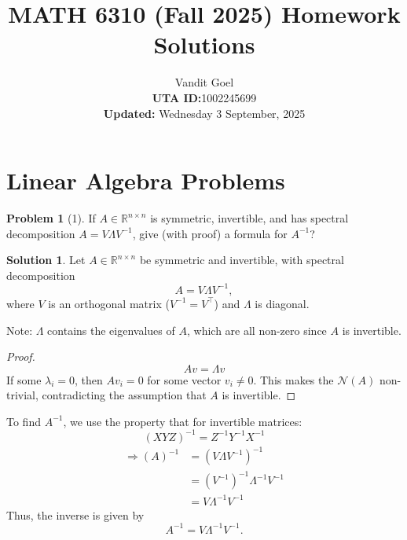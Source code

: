 \documentclass{amsart}[11pt]
\title{MATH 6310 (Fall 2025) Homework Solutions}
\author{Vandit Goel\\\textbf{UTA ID:}1002245699\\\textbf{Updated:} Wednesday  3 September, 2025}
\theoremstyle{definition}
\newtheorem*{problem}{Problem}
\newtheorem*{solution}{Solution}
\newcommand{\R}{\mathbb{R}}
\begin{document}
\maketitle

\section{Linear Algebra Problems}

\begin{problem}[1]
If $A\in\R^{n\times n}$ is symmetric, invertible, and has spectral decomposition $A=V\Lambda V^{-1}$, give (with proof) a formula for $A^{-1}$?

\begin{solution}
Let $A \in \mathbb{R}^{n \times n}$ be symmetric and invertible, with spectral decomposition
\[
A = V \Lambda V^{-1},
\]
where $V$ is an orthogonal matrix ($V^{-1} = V^\top$) and $\Lambda$ is diagonal.

Note: $\Lambda$ contains the eigenvalues of $A$, which are all non-zero since $A$ is invertible.
\begin{proof}
    \[Av=\Lambda v\]
    If some $\lambda_{i}=0$, then $Av_{i}=0$ for some vector $v_{i} \neq 0$. This makes the $\mathcal{N}(A)$ non-trivial, contradicting the assumption that $A$ is invertible.
\end{proof}

\vspace{\baselineskip}
\noindent To find $A^{-1}$, we use the property that for invertible matrices:
\[
(XYZ)^{-1} = Z^{-1} Y^{-1} X^{-1}
\]
\begin{align*}
	\Rightarrow(A)^{-1} &= (V \Lambda V^{-1})^{-1} \\
	&= (V^{-1})^{-1}\Lambda^{-1} V^{-1} \\
	&= V\Lambda^{-1} V^{-1}
\end{align*}
Thus, the inverse is given by
\[
A^{-1} = V \Lambda^{-1} V^{-1}.
\]
\end{solution}
\end{problem}
\end{document}
